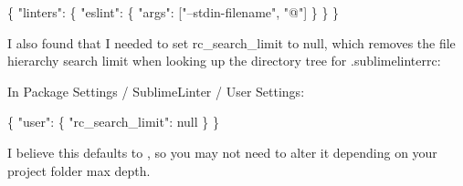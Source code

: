 \begin{DoxyCode}
\{
  "linters": \{
    "eslint": \{
      "args": ["--stdin-filename", "@"]
    \}
  \}
\}
\end{DoxyCode}


I also found that I needed to set {\ttfamily rc\+\_\+search\+\_\+limit} to {\ttfamily null}, which removes the file hierarchy search limit when looking up the directory tree for {\ttfamily .sublimelinterrc}\+:

In Package Settings / Sublime\+Linter / User Settings\+: 
\begin{DoxyCode}
\{
  "user": \{
    "rc\_search\_limit": null
  \}
\}
\end{DoxyCode}


I believe this defaults to {}, so you may not need to alter it depending on your project folder max depth. 